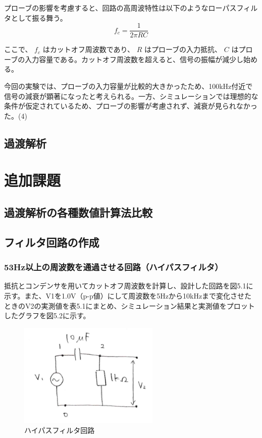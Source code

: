 \documentclass{jlreq}
\numberwithin{equation}{section}
\begin{document}
プローブの影響を考慮すると、回路の高周波特性は以下のようなローパスフィルタとして振る舞う。
\[
f_c = \frac{1}{2 \pi R C}
\]

ここで、 \( f_c \) はカットオフ周波数であり、 \( R \) はプローブの入力抵抗、 \( C \) はプローブの入力容量である。カットオフ周波数を超えると、信号の振幅が減少し始める。

今回の実験では、プローブの入力容量が比較的大きかったため、100kHz付近で信号の減衰が顕著になったと考えられる。一方、シミュレーションでは理想的な条件が仮定されているため、プローブの影響が考慮されず、減衰が見られなかった。(4)

\subsection{過渡解析}


\section{追加課題}

\subsection{過渡解析の各種数値計算法比較}

\subsection{フィルタ回路の作成}
\subsubsection{53Hz以上の周波数を通過させる回路（ハイパスフィルタ）}
抵抗とコンデンサを用いてカットオフ周波数を計算し、設計した回路を図5.1に示す。また、V1を1.0V（p-p値）にして周波数を5Hzから10kHzまで変化させたときのV2の実測値を表5.1にまとめ、シミュレーション結果と実測値をプロットしたグラフを図5.2に示す。

\begin{figure}[H]
  \centering
  \includegraphics[width=0.6\textwidth]{assets/highpasskairo.png}
  \caption{ハイパスフィルタ回路}
\end{figure}
\end{document}
